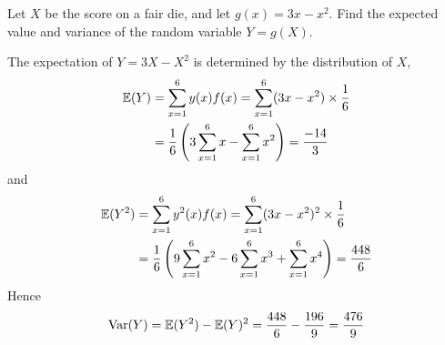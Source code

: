 \begin{exercise}
\begin{questions}
%

\question
Let $X$ be the score on a fair die, and let $g(x)=3x-x^2$. Find the expected value and variance of the random variable $Y=g(X)$.
\begin{answer}
The expectation of $Y=3X-X^2$ is determined by the distribution of $X$,
\begin{align*}
\mathbb{E}(Y)
	& = \sum_{x=1}^6 y(x)f(x) = \sum_{x=1}^6 (3x-x^2)\times \frac{1}{6} \\
	& = \frac{1}{6}\left(3\sum_{x=1}^6 x - \sum_{x=1}^6 x^2\right) = \frac{-14}{3}
\end{align*}
and
\begin{align*}
\mathbb{E}(Y^2)
	& = \sum_{x=1}^6 y^2(x)f(x) = \sum_{x=1}^6 (3x-x^2)^2\times \frac{1}{6} \\
	& = \frac{1}{6}\left(9\sum_{x=1}^6 x^2 - 6\sum_{x=1}^6 x^3 + \sum_{x=1}^6 x^4\right) = \frac{448}{6}
\end{align*}
Hence
\[
\text{Var}(Y) = \mathbb{E}(Y^2) - \mathbb{E}(Y)^2 = \frac{448}{6} - \frac{196}{9} = \frac{476}{9}
\]
\end{answer}


\end{questions}
\end{exercise}
